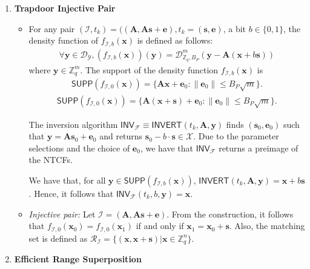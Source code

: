 \begin{defn}
\begin{enumerate}
\begin{itemize}
    \end{itemize}
    \item \textbf{Trapdoor Injective Pair}
    \begin{itemize}
        \item For any pair $(\mathcal{I},t_{k})=((\mathbf{A},\mathbf{A}\mathbf{s}+\mathbf{e}),t_{k}=(\mathbf{s},\mathbf{e})$, a bit $b\in\{0,1\}$, the density function of $f_{\mathcal{I},b}(\mathbf{x})$ is defined as follows:
        \begin{align}
            \forall \mathbf{y}\in\mathcal{D}_{\mathcal{Y}},(f_{\mathcal{I},b}(\mathbf{x}))(\mathbf{y})=\mathcal{D}^{m}_{\mathbb{Z}_q,B_P}(\mathbf{y}-\mathbf{A}(\mathbf{x}+b\mathbf{s}))
        \end{align}
        where $\mathbf{y}\in\mathbb{Z}^m_q$. The support of the density function $f_{\mathcal{I},b}(\mathbf{x})$ is 
        \begin{align}
            \mathsf{SUPP}(f_{\mathcal{I},0}(\mathbf{x}))=\{\mathbf{A}\mathbf{x}+\mathbf{e}_0:\|\mathbf{e}_0\|\leq B_P\sqrt{m}\}.
        \end{align}
        \begin{align}
             \mathsf{SUPP}(f_{\mathcal{I},0}(\mathbf{x}))=\{\mathbf{A}(\mathbf{x}+\mathbf{s})+\mathbf{e}_0:\|\mathbf{e}_0\|\leq B_P\sqrt{m}\}.
        \end{align}
        
    The inversion algorithm $\mathsf{INV}_\mathcal{F} \equiv \mathsf{INVERT}(t_{k}, \mathbf{A}, \mathbf{y})$ finds $(\mathbf{s}_0, \mathbf{e}_0)$ such that $\mathbf{y} = \mathbf{A}\mathbf{s}_0 + \mathbf{e}_0$ and returns $\mathbf{s}_0 - b \cdot \mathbf{s} \in \mathcal{X}$. Due to the parameter selections and the choice of $\mathbf{e}_0$, we have that $\mathsf{INV}_\mathcal{F}$ returns a preimage of the NTCFs.
       
       We have that, for all $\mathbf{y}\in \mathsf{SUPP}(f_{\mathcal{I},b}(\mathbf{x}))$, $\mathsf{INVERT}(t_{k},\mathbf{A},\mathbf{y})=\mathbf{x}+b\mathbf{s}$. Hence, it follows that $\mathsf{INV}_\mathcal{F}(t_{k},b,\mathbf{y})=\mathbf{x}$.
        
        \item \textit{Injective pair:} Let $\mathcal{I}=(\mathbf{A},\mathbf{A}\mathbf{s}+\mathbf{e})$. From the construction, it follows that $f_{\mathcal{I},0}(\mathbf{x}_0)= f_{\mathcal{I},0}(\mathbf{x}_1)$ if and only if $\mathbf{x}_1=\mathbf{x}_0+\mathbf{s}$. Also, the matching set is defined as $\mathcal{R}_{\mathcal{I}}=\{(\mathbf{x},\mathbf{x}+\mathbf{s})|\mathbf{x}\in \mathbb{Z}^n_q\}$.
    \end{itemize}
    \item \textbf{Efficient Range Superposition} 
    

\end{enumerate}
\end{defn}
